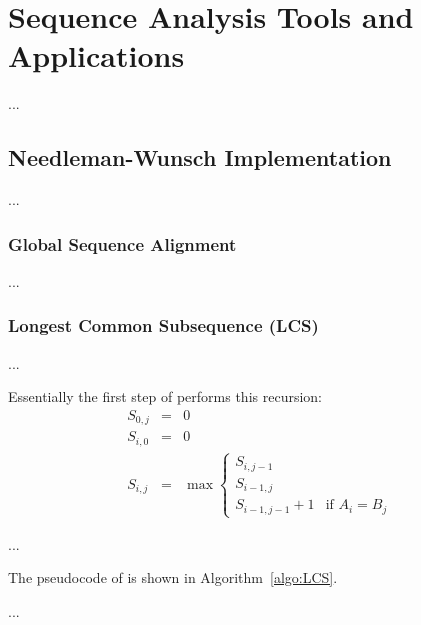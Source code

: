 
\chapter{Sequence Analysis Tools and Applications}
\label{chap:sequence}


...


\section{Needleman-Wunsch Implementation}
\label{sec:nw}

...


\subsection{Global Sequence Alignment}
\label{sec:seqglobal}

...

\subsection{Longest Common Subsequence (LCS)}
\label{sec:lcs}


...

Essentially the first step of  performs this
recursion:
\begin{eqnarray}
S_{0,j} &=& 0\\
S_{i,0} &=& 0\\
S_{i,j} &=& \max
\begin{cases}
  S_{i,j-1} & \\
  S_{i-1,j} & \\
  S_{i-1,j-1} + 1 & \textrm{if } A_i = B_j
\end{cases}
\end{eqnarray}

...

The pseudocode of  is shown in Algorithm~\ref{algo:LCS}.

...




